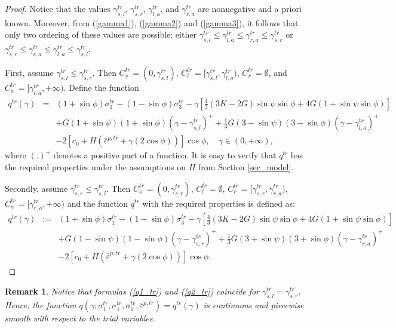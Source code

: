 \documentclass[a4paper,12pt]{article}
\newtheorem{remark}{Remark}[section]
\theoremstyle{remark}
\numberwithin{equation}{section}
\begin{document}
\begin{proof}
Notice that the values $\gamma^{tr}_{s,l}$, $\gamma^{tr}_{s,r}$, $\gamma^{tr}_{l,a}$, and $\gamma^{tr}_{r,a}$ are nonnegative and a priori known. Moreover, from (\ref{gamma1}), (\ref{gamma2}) and (\ref{gamma3}), it follows that only two ordering of these values are possible: either $\gamma^{tr}_{s,l}\leq\gamma^{tr}_{l,a}\leq\gamma^{tr}_{r,a}\leq\gamma^{tr}_{s,r}$ or $\gamma^{tr}_{s,r}\leq\gamma^{tr}_{r,a}\leq\gamma^{tr}_{l,a}\leq\gamma^{tr}_{s,l}$. 

First, assume $\gamma^{tr}_{s,l}\leq\gamma^{tr}_{s,r}$. Then $C^{tr}_s=(0,\gamma^{tr}_{s,l})$, $C^{tr}_l=[\gamma^{tr}_{s,l},\gamma^{tr}_{l,a})$,  $C^{tr}_r=\emptyset$, and $C^{tr}_a=[\gamma^{tr}_{l,a},+\infty)$. Define the function 
\begin{eqnarray}
q^{tr}(\gamma)&=&(1+\sin\phi)\sigma_1^{tr}-(1-\sin\phi)\sigma_3^{tr}-\gamma\left[\frac{4}{3}(3K-2G)\sin\psi\sin\phi+4G(1+\sin\psi\sin\phi)\right]\nonumber\\
&&+G(1+\sin\psi)(1+\sin\phi)(\gamma-\gamma^{tr}_{s,l})^++\frac{1}{3}G(3-\sin\psi)(3-\sin\phi)(\gamma-\gamma^{tr}_{l,a})^+\nonumber\\
&&-2\left[c_0+H\left(\bar{\varepsilon}^{p,tr}+\gamma (2\cos\phi)\right)\right]\cos\phi,\quad\gamma\in(0,+\infty),
\label{q1_tr}
\end{eqnarray}
where $(.)^+$ denotes a positive part of a function. It is easy to verify that  $q^{tr}$ has the required properties under the assumptions on $H$ from Section \ref{sec_model}.

Secondly, assume  $\gamma^{tr}_{s,r}\leq\gamma^{tr}_{s,l}$. Then $C^{tr}_s=(0,\gamma^{tr}_{s,r})$,  $C^{tr}_l=\emptyset$, $C^{tr}_r=[\gamma^{tr}_{s,r},\gamma^{tr}_{r,a})$,  $C^{tr}_a=[\gamma^{tr}_{r,a},+\infty)$ and the function $q^{tr}$ with the required properties is defined as:
\begin{eqnarray}
q^{tr}(\gamma)&:=&(1+\sin\phi)\sigma_1^{tr}-(1-\sin\phi)\sigma_3^{tr}-\gamma\left[\frac{4}{3}(3K-2G)\sin\psi\sin\phi+4G(1+\sin\psi\sin\phi)\right]\nonumber\\
&&+G(1-\sin\psi)(1-\sin\phi)(\gamma-\gamma^{tr}_{s,r})^++\frac{1}{3}G(3+\sin\psi)(3+\sin\phi)(\gamma-\gamma^{tr}_{r,a})^+\nonumber\\
&&-2\left[c_0+H\left(\bar{\varepsilon}^{p,tr}+\gamma (2\cos\phi)\right)\right]\cos\phi.
\label{q2_tr}
\end{eqnarray}
\end{proof}

\begin{remark}
\emph{Notice that formulas (\ref{q1_tr}) and (\ref{q2_tr}) coincide for $\gamma^{tr}_{s,l}=\gamma^{tr}_{s,r}$. Hence, the function $q(\gamma; \sigma_1^{tr}, \sigma_1^{tr}, \sigma_1^{tr},\bar\varepsilon^{p,tr})=q^{tr}(\gamma)$ is continuous and piecewise smooth with respect to the trial variables. }
\label{rem_semismooth}
\end{remark}
\end{document}
